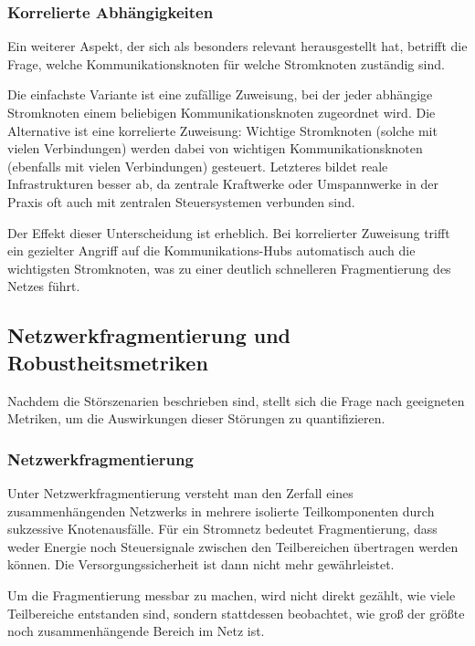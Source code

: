 \subsubsection{Korrelierte Abhängigkeiten}

Ein weiterer Aspekt, der sich als besonders relevant herausgestellt hat, betrifft die Frage, welche Kommunikationsknoten für welche Stromknoten zuständig sind.

Die einfachste Variante ist eine zufällige Zuweisung, bei der jeder abhängige Stromknoten einem beliebigen Kommunikationsknoten zugeordnet wird. Die Alternative ist eine korrelierte Zuweisung: Wichtige Stromknoten (solche mit vielen Verbindungen) werden dabei von wichtigen Kommunikationsknoten (ebenfalls mit vielen Verbindungen) gesteuert. Letzteres bildet reale Infrastrukturen besser ab, da zentrale Kraftwerke oder Umspannwerke in der Praxis oft auch mit zentralen Steuersystemen verbunden sind.

Der Effekt dieser Unterscheidung ist erheblich. Bei korrelierter Zuweisung trifft ein gezielter Angriff auf die Kommunikations-Hubs automatisch auch die wichtigsten Stromknoten, was zu einer deutlich schnelleren Fragmentierung des Netzes führt.

\subsection{Netzwerkfragmentierung und Robustheitsmetriken}
\label{sec:metriken}

Nachdem die Störszenarien beschrieben sind, stellt sich die Frage nach geeigneten Metriken, um die Auswirkungen dieser Störungen zu quantifizieren.

\subsubsection{Netzwerkfragmentierung}

Unter Netzwerkfragmentierung versteht man den Zerfall eines zusammenhängenden Netzwerks in mehrere isolierte Teilkomponenten durch sukzessive Knotenausfälle. Für ein Stromnetz bedeutet Fragmentierung, dass weder Energie noch Steuersignale zwischen den Teilbereichen übertragen werden können. Die Versorgungssicherheit ist dann nicht mehr gewährleistet.

Um die Fragmentierung messbar zu machen, wird nicht direkt gezählt, wie viele Teilbereiche entstanden sind, sondern stattdessen beobachtet, wie groß der größte noch zusammenhängende Bereich im Netz ist.

